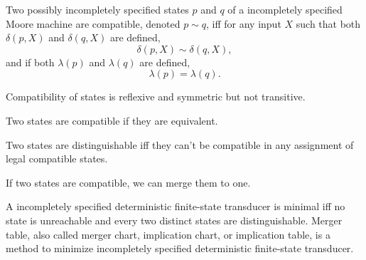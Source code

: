 \documentclass[a4paper,12pt]{report}
\begin{document}
Two possibly incompletely specified states $p$ and $q$ of a incompletely specified Moore machine are compatible, denoted $p\sim q$, iff for any input $X$ such that both $\delta(p,X)$ and $\delta(q,X)$ are defined,
\[\delta(p,X)\sim\delta(q,X),\]
and if both $\lambda(p)$ and $\lambda(q)$ are defined,
\[\lambda(p)=\lambda(q).\]

Compatibility of states is reflexive and symmetric but not transitive.

Two states are compatible if they are equivalent.

Two states are distinguishable iff they can't be compatible in any assignment of legal compatible states.

If two states are compatible, we can merge them to one.

A incompletely specified deterministic finite-state transducer is minimal iff no state is unreachable and every two distinct states are distinguishable.
Merger table, also called merger chart, implication chart, or implication table, is a method to minimize incompletely specified deterministic finite-state transducer.
\end{document}
